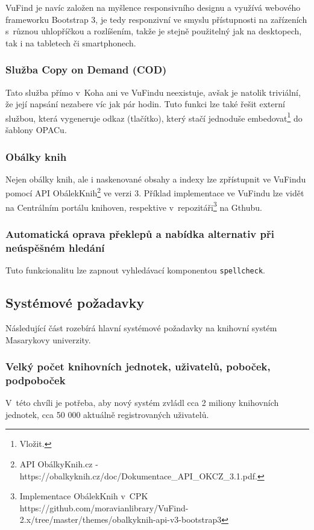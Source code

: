 \documentclass[
	11pt, oneside, printed, draft, 
	table,   %
	lof,     %
	lot     %
]{fithesis3}
\newcommand{\code}[1]{\texttt{#1}}
\begin{document}
{VuFind je navíc založen na myšlence responsivního designu a využívá webového frameworku  Bootstrap 3, je tedy responzivní ve smyslu přístupnosti na zařízeních s~různou uhlopříčkou a rozlíšením, takže je stejně použitelný jak na desktopech, tak i na tabletech či smartphonech.

\subsubsection{Služba Copy on Demand (COD)}
Tato služba přímo v~Koha ani ve VuFindu neexistuje, avšak je natolik triviální, že její napsání nezabere víc jak pár hodin. Tuto funkci lze také řešit externí službou, která vygeneruje odkaz (tlačítko), který stačí jednoduše embedovat\footnote{Vložit.} do šablony OPACu.


\subsubsection{Obálky knih}
Nejen obálky knih, ale i naskenované obsahy a indexy lze zpřístupnit ve VuFindu pomocí API ObálekKnih\footnote{API ObálkyKnih.cz - https://obalkyknih.cz/doc/Dokumentace\_API\_OKCZ\_3.1.pdf.} ve verzi 3. Příklad implementace ve VuFindu lze vidět na Centrálním portálu knihoven, respektive v~repozitáři\footnote{Implementace ObálekKnih v~CPK https://github.com/moravianlibrary/VuFind-2.x/tree/master/themes/obalkyknih-api-v3-bootstrap3} na Gthubu.

\subsubsection{Automatická oprava překlepů a nabídka alternativ při neúspěšném hledání}
Tuto funkcionalitu lze zapnout vyhledávací komponentou \code{spellcheck}.

\subsection{Systémové požadavky}
Následující část rozebírá hlavní systémové požadavky na knihovní systém Masarykovy univerzity.

\subsubsection{Velký počet knihovních jednotek, uživatelů, poboček, podpoboček}
V~této chvíli je potřeba, aby nový systém zvládl cca 2 miliony knihovních jednotek, cca 50 000 aktuálně registrovaných  uživatelů.

}
\end{document}
